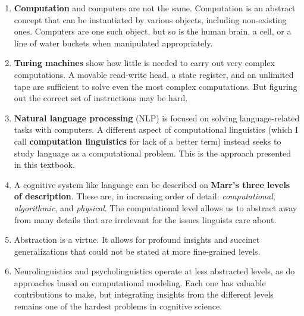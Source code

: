 \begin{enumerate}
    \item \textbf{Computation} and computers are not the same.
          Computation is an abstract concept that can be instantiated by various objects, including non-existing ones.
          Computers are one such object, but so is the human brain, a cell, or a line of water buckets when manipulated appropriately.
    \item \textbf{Turing machines} show how little is needed to carry out very complex computations.
          A movable read-write head, a state register, and an unlimited tape are sufficient to solve even the most complex computations.
          But figuring out the correct set of instructions may be hard.
    \item \textbf{Natural language processing} (NLP) is focused on solving language-related tasks with computers.
          A different aspect of computational linguistics (which I call \textbf{computation linguistics} for lack of a better term) instead seeks to study language as a computational problem.
          This is the approach presented in this textbook.
    \item A cognitive system like language can be described on \textbf{Marr's three levels of description}.
          These are, in increasing order of detail: \emph{computational}, \emph{algorithmic}, and \emph{physical}.
          The computational level allows us to abstract away from many details that are irrelevant for the issues linguists care about.
    \item Abstraction is a virtue.
          It allows for profound insights and succinct generalizations that could not be stated at more fine-grained levels.
    \item Neurolinguistics and psycholinguistics operate at less abstracted levels, as do approaches based on computational modeling.
          Each one has valuable contributions to make, but integrating insights from the different levels remains one of the hardest problems in cognitive science.
\end{enumerate}

